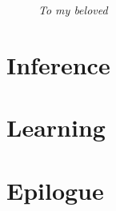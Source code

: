 \documentclass[g5paper,phd,electronic]{kthesis}
\begin{document}
\frontmatter
\maketitle
\thispagestyle{empty}
\vfill
\begin{figure}
\begin{flushright}
\Large
\textit{To my beloved}
\end{flushright}
\end{figure}
\vfill







\tableofcontents


\mainmatter





\part{Inference}





\part{Learning}






\part{Epilogue}





\end{document}
